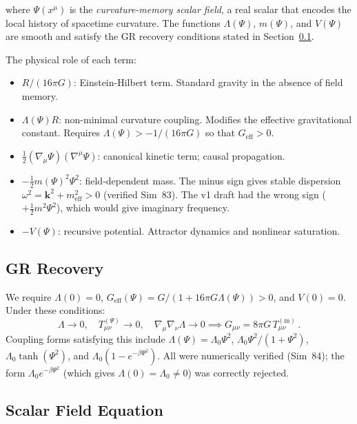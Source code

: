 \documentclass[12pt,a4paper]{article}
\begin{document}
where $\Psi(x^\mu)$ is the \emph{curvature-memory scalar field}, a real scalar
that encodes the local history of spacetime curvature. The functions
$\Lambda(\Psi)$, $m(\Psi)$, and $V(\Psi)$ are smooth and satisfy the GR
recovery conditions stated in Section~\ref{sec:GR_limit}.

The physical role of each term:
\begin{itemize}
  \item $R/(16\pi G)$: Einstein-Hilbert term. Standard gravity in the absence of field memory.
  \item $\Lambda(\Psi)R$: non-minimal curvature coupling. Modifies the effective gravitational constant. Requires $\Lambda(\Psi) > -1/(16\pi G)$ so that $G_{\mathrm{eff}} > 0$.
  \item $\tfrac{1}{2}(\nabla_\mu\Psi)(\nabla^\mu\Psi)$: canonical kinetic term; causal propagation.
  \item $-\tfrac{1}{2}m(\Psi)^2\Psi^2$: field-dependent mass. The minus sign gives stable dispersion $\omega^2 = \mathbf{k}^2 + m_{\mathrm{eff}}^2 > 0$ (verified Sim~83). The v1 draft had the wrong sign ($+\tfrac{1}{2}m^2\Psi^2$), which would give imaginary frequency.
  \item $-V(\Psi)$: recursive potential. Attractor dynamics and nonlinear saturation.
\end{itemize}

\subsection{GR Recovery}
\label{sec:GR_limit}

We require $\Lambda(0) = 0$, $G_{\mathrm{eff}}(\Psi) = G/(1 + 16\pi G\Lambda(\Psi)) > 0$,
and $V(0) = 0$. Under these conditions:
\begin{equation}
\Lambda \to 0,\quad T^{(\Psi)}_{\mu\nu} \to 0,\quad
\nabla_\mu\nabla_\nu\Lambda \to 0
\implies
G_{\mu\nu} = 8\pi G\,T^{(\mathrm{m})}_{\mu\nu}\,.
\end{equation}
Coupling forms satisfying this include $\Lambda(\Psi) = \Lambda_0\Psi^2$,
$\Lambda_0\Psi^2/(1+\Psi^2)$, $\Lambda_0\tanh(\Psi^2)$, and
$\Lambda_0(1-e^{-\beta\Psi^2})$. All were numerically verified (Sim~84);
the form $\Lambda_0 e^{-\beta\Psi^2}$ (which gives $\Lambda(0) = \Lambda_0 \neq 0$)
was correctly rejected.

\subsection{Scalar Field Equation}
\label{sec:scalar_eq}
\end{document}
